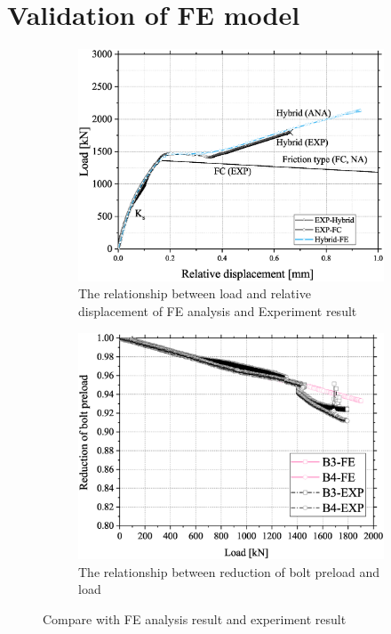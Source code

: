 \section{Validation of FE model}
\label{sec-valid}


\begin{figure}
    \centering
    \begin{subfigure}[b]{0.48\linewidth}
        \includegraphics[width=\linewidth]{imgs/ch7/valid-rd.eps}
        \caption{The relationship between load and relative displacement of FE analysis and Experiment result}
        \label{fig-valid-rd}
    \end{subfigure}
    \hfill
    \begin{subfigure}[b]{0.48\linewidth}
    \centering
        \includegraphics[width=\linewidth]{imgs/ch7/valid-boltAF.eps}
        \caption{The relationship between reduction of bolt preload and load}
        \label{fig-valid-redc}
    \end{subfigure}
    
    \caption{Compare with FE analysis result and experiment result \cite{chen_experimental_2024} }
    \label{fig-valid}
\end{figure}

